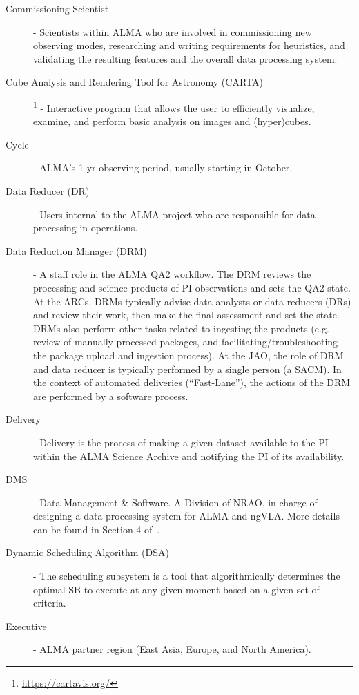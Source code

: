 \begin{description}
\item[Commissioning Scientist] - Scientists within ALMA who are involved in commissioning new observing modes, researching and writing requirements for heuristics, and validating the resulting features and the overall data processing system. %
\item[Cube Analysis and Rendering Tool for Astronomy (CARTA)]\footnote{\url{https://cartavis.org/}} - Interactive program that allows the user to efficiently visualize, examine, and perform basic analysis on images and (hyper)cubes.
\item[Cycle] - ALMA's 1-yr observing period, usually starting in October. 
\item[Data Reducer (DR)] - Users internal to the ALMA project who are responsible for data processing in operations.
\item[Data Reduction Manager (DRM)] - A staff role in the ALMA QA2 workflow. The DRM reviews the processing and science products of PI observations and sets the QA2 state. At the ARCs, DRMs typically advise data analysts or data reducers (DRs) and review their work, then make the final assessment and set the state. DRMs also perform other tasks related to ingesting the products (e.g. review of manually processed packages, and facilitating/troubleshooting the package upload and ingestion process). At the JAO, the role of DRM and data reducer is typically performed by a single person (a SACM). In the context of automated deliveries (``Fast-Lane''), the actions of the DRM are performed by a software process.
\item[Delivery] - Delivery is the process of making a given dataset available to the PI within the ALMA Science Archive and notifying the PI of its availability.
\item[DMS] - Data Management \& Software. A Division of NRAO, in charge of designing a data processing system for ALMA and ngVLA. More details can be found in Section 4 of~\cite{dp}. 
\item[Dynamic Scheduling Algorithm (DSA)] - The scheduling subsystem is a tool that algorithmically determines the optimal SB to execute at any given moment based on a given set of criteria.
\item[Executive] - ALMA partner region (East Asia, Europe, and North America).

\end{description}
